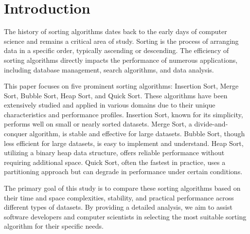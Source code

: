 \documentclass[sigplan,screen]{acmart}
\begin{document}


\maketitle

\section*{Introduction}
  The history of sorting algorithms dates back to the early days of computer
  science and remains a critical area of study. Sorting is the process of
  arranging data in a specific order, typically ascending or descending.
  The efficiency of sorting algorithms directly impacts the performance of
  numerous applications, including database management, search algorithms,
  and data analysis.

  This paper focuses on five prominent sorting algorithms: Insertion Sort,
  Merge Sort, Bubble Sort, Heap Sort, and Quick Sort. These algorithms have 
  been extensively studied and applied in various domains due to their 
  unique characteristics and performance profiles. Insertion Sort, known for
  its simplicity, performs well on small or nearly sorted datasets. 
  Merge Sort, a divide-and-conquer algorithm, is stable and effective for 
  large datasets. Bubble Sort, though less efficient for large datasets, 
  is easy to implement and understand. Heap Sort, utilizing a binary heap 
  data structure, offers reliable performance without requiring additional 
  space. Quick Sort, often the fastest in practice, uses a partitioning 
  approach but can degrade in performance under certain conditions.

  The primary goal of this study is to compare these sorting algorithms 
  based on their time and space complexities, stability, and practical 
  performance across different types of datasets. By providing a detailed 
  analysis, we aim to assist software developers and computer scientists 
  in selecting the most suitable sorting algorithm for their specific needs.
  
\end{document}
